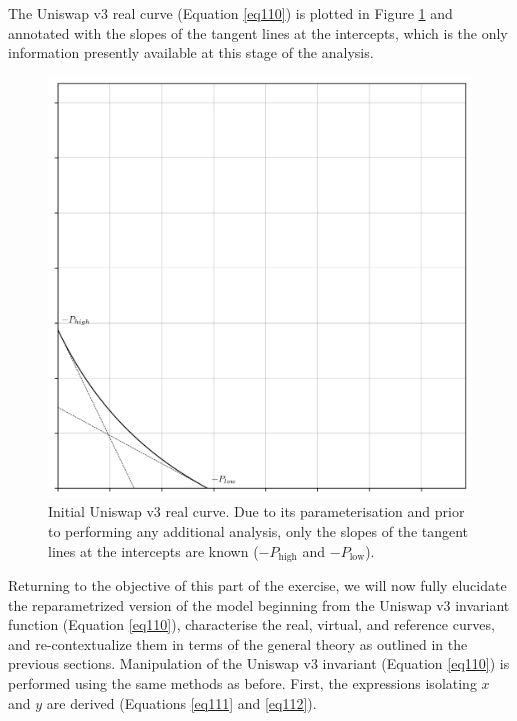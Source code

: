 \documentclass{article}
\begin{document}
The Uniswap v3 real curve (Equation \ref{eq110}) is plotted in Figure \ref{fig22} and annotated with the slopes of the tangent lines at the intercepts, which is the only information presently available at this stage of the analysis. 

\begin{figure}[ht]
    \centering
    \includegraphics[width=\textwidth]{fig22.png}
    \captionsetup{
        justification=raggedright,
        singlelinecheck=false,
        font=small,
        labelfont=bf,
        labelsep=quad,
        format=plain
    }
    \caption{Initial Uniswap v3 real curve. Due to its parameterisation and prior to performing any additional analysis, only the slopes of the tangent lines at the intercepts are known ($-P_{\text{high}}$ and $-P_{\text{low}}$).}
    \label{fig22}
\end{figure}

Returning to the objective of this part of the exercise, we will now fully elucidate the reparametrized version of the model beginning from the Uniswap v3 invariant function (Equation \ref{eq110}), characterise the real, virtual, and reference curves, and re-contextualize them in terms of the general theory as outlined in the previous sections. Manipulation of the Uniswap v3 invariant (Equation \ref{eq110}) is performed using the same methods as before. First, the expressions isolating $x$ and $y$ are derived (Equations \ref{eq111} and \ref{eq112}).
\end{document}

